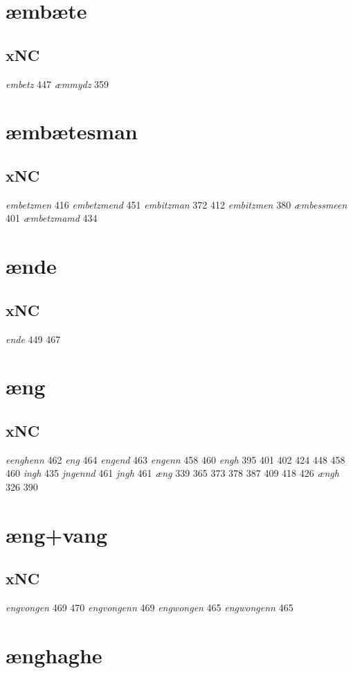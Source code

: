 \documentclass[a4paper,twocolumn]{article}
\begin{document}
\section{æmbæte}
\label{sec:orgc9e4df3}
\subsection{xNC}
\label{sec:org28c51f3}
\emph{embetz} 447 \emph{æmmydz} 359 
\section{æmbætesman}
\label{sec:orgccd6fce}
\subsection{xNC}
\label{sec:org867bdd2}
\emph{embetzmen} 416 \emph{embetzmend} 451 \emph{embitzman} 372 412 \emph{embitzmen} 380 \emph{æmbessmeen} 401 \emph{æmbetzmamd} 434 
\section{ænde}
\label{sec:org3d6fbea}
\subsection{xNC}
\label{sec:orge28259c}
\emph{ende} 449 467 
\section{æng}
\label{sec:orge583a33}
\subsection{xNC}
\label{sec:org41e3086}
\emph{eenghenn} 462 \emph{eng} 464 \emph{engend} 463 \emph{engenn} 458 460 \emph{engh} 395 401 402 424 448 458 460 \emph{ingh} 435 \emph{jngennd} 461 \emph{jngh} 461 \emph{æng} 339 365 373 378 387 409 418 426 \emph{ængh} 326 390 
\section{æng+vang}
\label{sec:org99f96b5}
\subsection{xNC}
\label{sec:org7656c24}
\emph{engvongen} 469 470 \emph{engvongenn} 469 \emph{engwongen} 465 \emph{engwongenn} 465 
\section{ænghaghe}
\label{sec:org5feeaaf}
\end{document}
